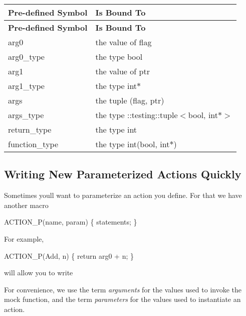 \tabulinesep=1mm
\begin{longtabu} spread 0pt [c]{*{2}{|X[-1]}|}
\hline
\rowcolor{\tableheadbgcolor}\textbf{ {\bfseries Pre-\/defined Symbol} }&\textbf{ {\bfseries Is Bound To}  }\\
\endfirsthead
\hline
\endfoot
\hline
\rowcolor{\tableheadbgcolor}\textbf{ {\bfseries Pre-\/defined Symbol} }&\textbf{ {\bfseries Is Bound To}  }\\
\endhead
{\ttfamily arg0} &the value of {\ttfamily flag} \\
{\ttfamily arg0\+\_\+type} &the type {\ttfamily bool} \\
{\ttfamily arg1} &the value of {\ttfamily ptr} \\
{\ttfamily arg1\+\_\+type} &the type {\ttfamily int$\ast$} \\
{\ttfamily args} &the tuple {\ttfamily (flag, ptr)} \\
{\ttfamily args\+\_\+type} &the type {\ttfamily \+::testing\+::tuple$<$bool, int$\ast$$>$} \\
{\ttfamily return\+\_\+type} &the type {\ttfamily int} \\
{\ttfamily function\+\_\+type} &the type {\ttfamily int(bool, int$\ast$)} \\
\end{longtabu}
\subsection*{Writing New Parameterized Actions Quickly}

Sometimes you\textquotesingle{}ll want to parameterize an action you define. For that we have another macro 
\begin{DoxyCode}
ACTION\_P(name, param) \{ statements; \}
\end{DoxyCode}


For example, 
\begin{DoxyCode}
ACTION\_P(Add, n) \{ \textcolor{keywordflow}{return} arg0 + n; \}
\end{DoxyCode}
 will allow you to write 


For convenience, we use the term {\itshape arguments} for the values used to invoke the mock function, and the term {\itshape parameters} for the values used to instantiate an action.

